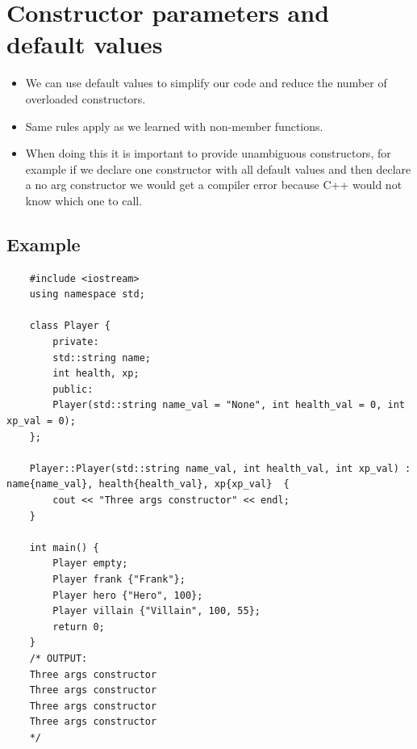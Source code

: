 \section{Constructor parameters and default values}
\begin{itemize}
    \item We can use default values to simplify our code and reduce the number of overloaded constructors.
    \item Same rules apply as we learned with non-member functions.
    \item When doing this it is important to provide unambiguous constructors, for example if we declare one constructor with all default values and then declare a no arg constructor we would get a compiler error because C++ would not know which one to call.
\end{itemize}

\subsection{Example}
\begin{verbatim}
    #include <iostream>
    using namespace std;

    class Player {
        private:
        std::string name;
        int health, xp;
        public:
        Player(std::string name_val = "None", int health_val = 0, int xp_val = 0);
    };

    Player::Player(std::string name_val, int health_val, int xp_val) : name{name_val}, health{health_val}, xp{xp_val}  {
        cout << "Three args constructor" << endl;
    }

    int main() {
        Player empty; 
        Player frank {"Frank"};
        Player hero {"Hero", 100};
        Player villain {"Villain", 100, 55};
        return 0;
    }
    /* OUTPUT:
    Three args constructor
    Three args constructor
    Three args constructor
    Three args constructor
    */
\end{verbatim}



